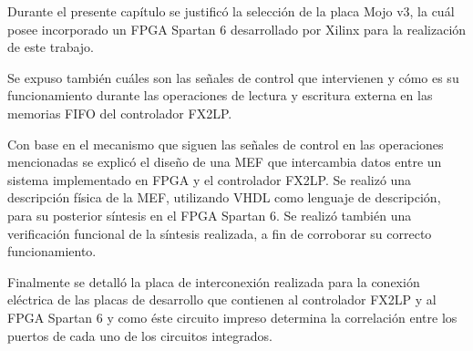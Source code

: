 Durante el presente capítulo se justificó la selección de la placa Mojo v3, la cuál posee incorporado un FPGA Spartan 6 desarrollado por Xilinx para la realización de este trabajo.

Se expuso también cuáles son las señales de control que intervienen y cómo es su funcionamiento durante las operaciones de lectura y escritura externa en las memorias FIFO del controlador FX2LP.

Con base en el mecanismo que siguen las señales de control en las operaciones mencionadas se explicó el diseño de una MEF que intercambia datos entre un sistema implementado en FPGA y el controlador FX2LP. Se realizó una descripción física de la MEF, utilizando VHDL como lenguaje de descripción, para su posterior síntesis en el FPGA Spartan 6. Se realizó también una verificación funcional de la síntesis realizada, a fin de corroborar su correcto funcionamiento.

Finalmente se detalló la placa de interconexión realizada para la conexión eléctrica de las placas de desarrollo que contienen al controlador FX2LP y al FPGA Spartan 6 y como éste circuito impreso determina la correlación entre los puertos de cada uno de los circuitos integrados.